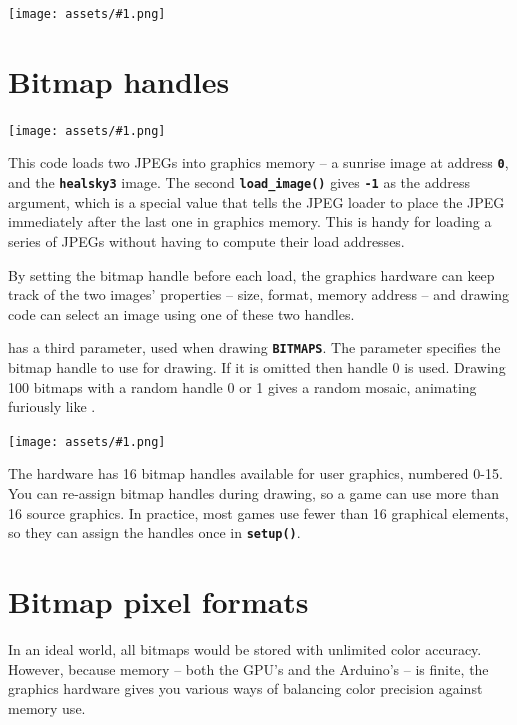 \documentclass[10pt]{book}
\makeatletter
\newcommand{\png}[1]{
\begin{center}
\texttt{[image: assets/\#1.png]}
\end{center}
}
\newcommand{\mach}[1]{\texttt{\textbf{#1}}}
\newcommand{\cmdidx}[1]{
\index{#1@\mach{#1()}}
}
\newcommand{\dcmd}[1]{\cmdidx{#1}\nameref{#1}}
\makeatother
\begin{document}



\png{0009}
\clearpage

\section{Bitmap handles}
\label{bitmaphandles}

\png{jpeg2}


This code loads two JPEGs into graphics memory -- a sunrise image at address \mach{0}, and the \mach{healsky3} image.
The second \mach{load\_image()} gives \mach{-1} as the address argument, which is a special value that
tells the JPEG loader to place the JPEG immediately after the last one in graphics memory.
This is handy for loading a series of JPEGs without having to compute their load addresses.

By setting the bitmap handle before each load, the graphics hardware can keep track of the two images' properties -- size, format, memory address -- 
and drawing code can select an image using one of these two handles.

\dcmd{Vertex2ii} has a third parameter, used when drawing \mach{BITMAPS}.
The parameter specifies the bitmap handle to use for drawing.
If it is omitted then handle 0 is used.  
Drawing 100 bitmaps with a random handle 0 or 1
gives a random mosaic, animating furiously like .
\png{0010}

The hardware has 16 bitmap handles available for user graphics, numbered 0-15.
You can re-assign bitmap handles during drawing, so a game can use more than 16 source graphics.
In practice, most games use fewer than 16 graphical elements, so they can assign the handles once in \mach{setup()}.

\newpage
\section{Bitmap pixel formats}

In an ideal world, all bitmaps would be stored with unlimited color accuracy.
However, because memory -- both the GPU's and the Arduino's -- is finite,
the graphics hardware gives you various ways of balancing color precision against memory use.

\newcommand{\fmline}[3]{
\index{#1 bitmap format@\mach{#1} bitmap format}
\index{bitmap format!#1@\mach{#1}}
\textbf{\large\mach{#1}} &
#3
& {\raisebox{-96pt}{\texttt{[image: \#2]}}} \\
}
\end{document}
